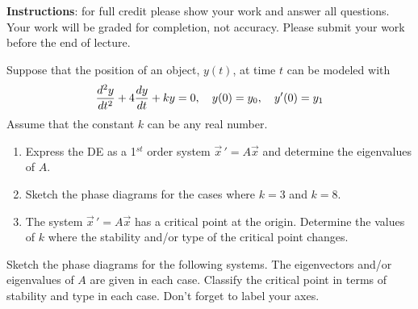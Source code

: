 \documentclass[12pt]{exam}
\begin{document}
\textbf{Instructions}: for full credit please show your work and answer all questions. Your work will be graded for completion, not accuracy. Please submit your work before the end of lecture. 
\begin{questions}

    \question[4] Suppose that the position of an object, $y(t)$, at time $t$ can be modeled with
    \begin{align}
        {\frac{d ^2y}{dt^2}} + 4 {\frac{dy}{dt}} + ky = 0, \quad y(0) = y_0, \quad y'(0) = y_1
    \end{align} 
    Assume that the constant $k$ can be any real number. 
\begin{enumerate}[label=\alph*)]
        \item Express the DE as a 1$^{st}$ order system $\vec x \, ' = A\vec x$ and determine the eigenvalues of $A$. \vspace{3cm}
        \item Sketch the phase diagrams for the cases where $k = 3$ and $k = 8$. 
        \vspace{12pt}
            \begin{center}
      \qquad  {}
    \end{center}
        \item The system $\vec x \, ' = A \vec x$ has a critical point at the origin. Determine the values of $k$ where the stability and/or type of the critical point changes. 
    \end{enumerate} 
    \newpage  


\vfill 
\question Sketch the phase diagrams for the following systems. The eigenvectors and/or eigenvalues of $A$ are given in each case. Classify the critical point in terms of stability and type in each case. Don't forget to label your axes. 
\end{questions}
\end{document}
